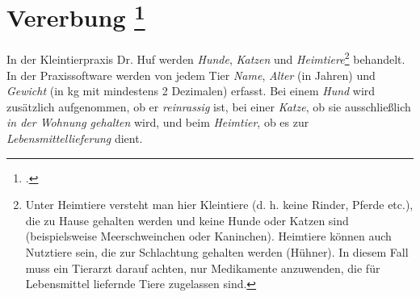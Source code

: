 \documentclass{bschlangaul-aufgabe}
\begin{document}

\section{Vererbung
\footcite{oomup:ab:5}}

In der Kleintierpraxis Dr. Huf werden \emph{Hunde}, \emph{Katzen} und
\emph{Heimtiere}\footnote{Unter Heimtiere versteht man hier Kleintiere
(d. h. keine Rinder, Pferde etc.), die zu Hause gehalten werden und
keine Hunde oder Katzen sind (beispielsweise Meerschweinchen oder
Kaninchen). Heimtiere können auch Nutztiere sein, die zur Schlachtung
gehalten werden (\zB Hühner). In diesem Fall muss ein Tierarzt darauf
achten, nur Medikamente anzuwenden, die für Lebensmittel liefernde Tiere
zugelassen sind.} behandelt. In der Praxissoftware werden von jedem Tier
\emph{Name}, \emph{Alter} (in Jahren) und \emph{Gewicht} (in kg mit
mindestens 2 Dezimalen) erfasst. Bei einem \emph{Hund} wird zusätzlich
aufgenommen, ob er \emph{reinrassig} ist, bei einer \emph{Katze}, ob sie
ausschließlich \emph{in der Wohnung gehalten} wird, und beim
\emph{Heimtier}, ob es zur \emph{Lebensmittellieferung} dient.
\end{document}
